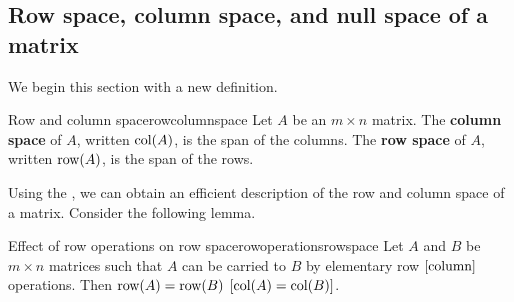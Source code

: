 \subsection{Row space, column space, and null space of a matrix}

We begin this section with a new definition.

\begin{definition}{Row and column space}{rowcolumnspace}
Let $A$ be an $m\times n$ matrix. The \textbf{column space} of $A$, written $\mbox{col}(A)$, is the
span of the columns. The \textbf{row space} of $A$, written $\mbox{row}(A)$, is the span of the rows.
\end{definition}

Using the {\rref}, we can obtain an efficient description of the row and column space of
a matrix. Consider the following lemma.

\begin{lemma}{Effect of row operations on row space}{rowoperationsrowspace}
Let $A$ and $B$ be $m\times n$ matrices such that $A$ can be carried to $B$ by elementary row $\left[\mbox{column}\right]$ operations. Then $\mbox{row}(A)=\mbox{row}(B)$ $\left[\mbox{col}(A)=\mbox{col}(B)\right]$.
\end{lemma}

